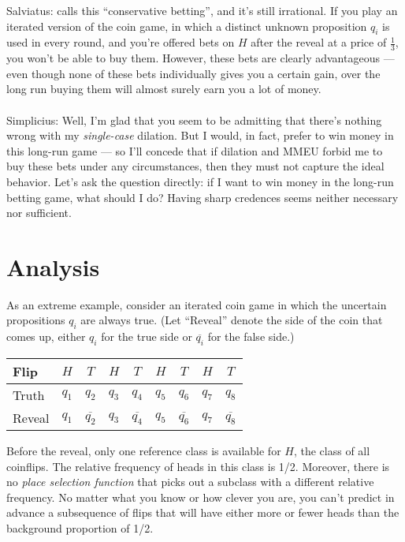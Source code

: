 \documentclass[letterpaper,12pt]{article}
\begin{document}
Salviatus: \citet[179]{White2009-WHIESA} calls this ``conservative betting'', and it's still irrational. If you play an iterated version of the coin game, in which a distinct unknown proposition $q_i$ is used in every round, and you're offered bets on $H$ after the reveal at a price of $\frac{1}{3}$, you won't be able to buy them. However, these bets are clearly advantageous --- even though none of these bets individually gives you a certain gain, over the long run buying them will almost surely earn you a lot of money.\\ \\
Simplicius: Well, I'm glad that you seem to be admitting that there's nothing wrong with my \emph{single-case} dilation. But I would, in fact, prefer to win money in this long-run game --- so I'll concede that if dilation and MMEU forbid me to buy these bets under any circumstances, then they must not capture the ideal behavior. Let's ask the question directly: if I want to win money in the long-run betting game, what should I do? Having sharp credences seems neither necessary nor sufficient.

\section{Analysis}
As an extreme example, consider an iterated coin game in which the uncertain propositions $q_i$ are always true. (Let ``Reveal'' denote the side of the coin that comes up, either $q_i$ for the true side or $\overline{q_i}$ for the false side.)

\begin{center}
\begin{tabular}{ l | c | c | c | c | c | c | c | c }
\hline Flip & $H$ & $T$ & $H$ & $T$ & $H$ & $T$ & $H$ & $T$ \\
\hline Truth & $q_1$ & $q_2$ & $q_3$ & $q_4$ & $q_5$ & $q_6$ & $q_7$ & $q_8$ \\
\hline Reveal & $q_1$ & $\overline{q_2}$ & $q_3$ & $\overline{q_4}$ & $q_5$ & $\overline{q_6}$ & $q_7$ & $\overline{q_8}$ \\ \hline
\end{tabular}
\end{center}

Before the reveal, only one reference class is available for $H$, the class of all coinflips. The relative frequency of heads in this class is 1/2. Moreover, there is no \emph{place selection function} \citep{Salmon1971-SALSE} that picks out a subclass with a different relative frequency. No matter what you know or how clever you are, you can't predict in advance a subsequence of flips that will have either more or fewer heads than the background proportion of 1/2.
\end{document}
